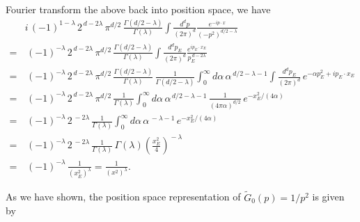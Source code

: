 \begin{solution}
    Fourier transform the above back into position space, we have
    \begin{equation}
\begin{aligned}
&i\,(-1)^{1-\lambda}\, 2^{\,d-2\lambda}\,\pi^{d/2}\,\frac{\Gamma(d/2-\lambda)}{\Gamma(\lambda)}\int\frac{d^dp}{(2\pi)^d}\frac{e^{-ip\cdot x}}{(-p^2)^{d/2-\lambda}}\\
=&\,(-1)^{-\lambda}\, 2^{\,d-2\lambda}\,\pi^{d/2}\,\frac{\Gamma(d/2-\lambda)}{\Gamma(\lambda)}\int\frac{d^dp_E}{(2\pi)^d}\frac{e^{ip_E\cdot x_E}}{p_E^{\,d-2\lambda}}\\
=&\,(-1)^{-\lambda}\, 2^{\,d-2\lambda}\,\pi^{d/2}\,\frac{\Gamma(d/2-\lambda)}{\Gamma(\lambda)}\,\frac{1}{\Gamma(d/2-\lambda)}\int_0^\infty d\alpha\,\alpha^{\,d/2-\lambda-1}\int\frac{d^dp_E}{(2\pi)^d}\,e^{-\alpha p_E^2 + ip_E\cdot x_E}\\
=&\,(-1)^{-\lambda}\, 2^{\,d-2\lambda}\,\pi^{d/2}\,\frac{1}{\Gamma(\lambda)}\int_0^\infty d\alpha\,\alpha^{\,d/2-\lambda-1}\,\frac{1}{(4\pi\alpha)^{d/2}}\,e^{-x_E^2/(4\alpha)}\\
=&\,(-1)^{-\lambda}\, 2^{\,-2\lambda}\,\frac{1}{\Gamma(\lambda)}\int_0^\infty d\alpha\,\alpha^{\,-\lambda-1}\,e^{-x_E^2/(4\alpha)}\\
=&\,(-1)^{-\lambda}\, 2^{\,-2\lambda}\,\frac{1}{\Gamma(\lambda)}\,\Gamma(\lambda)\left(\frac{x_E^2}{4}\right)^{\!-\lambda}\\
=&\,(-1)^{-\lambda}\,\frac{1}{(x_E^2)^{\lambda}}=\frac{1}{(x^2)^{\lambda}}.
\end{aligned}
\end{equation}

As we have shown, the position space representation of $\tilde{G}_0(p) = 1/p^2$ is given by

\end{solution}

